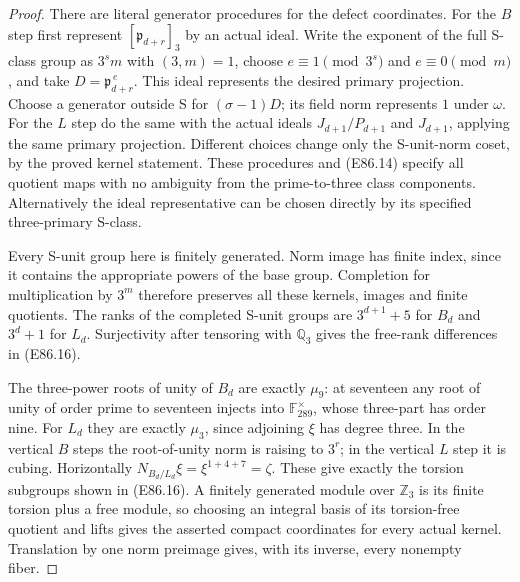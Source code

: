 \begin{proof}
There are literal generator procedures
for the defect coordinates. For the
$B$ step first represent
$[\mathfrak p_{d+r}]_3$ by an actual ideal.
Write the exponent of the full
S-class group as $3^s m$ with $(3,m)=1$,
choose $e\equiv1\pmod{3^s}$ and
$e\equiv0\pmod m$, and take
$D=\mathfrak p_{d+r}^{\,e}$.
This ideal represents the desired primary
projection. Choose a generator outside S
for $(\sigma-1)D$;
its field norm represents $1$ under
$\omega$. For the $L$ step do the same
with the actual ideals $J_{d+1}/P_{d+1}$
and $J_{d+1}$, applying the same primary
projection. Different choices change
only the S-unit-norm coset, by the
proved kernel statement. These procedures
and (E86.14) specify all quotient maps
with no ambiguity from the prime-to-three
class components. Alternatively the ideal
representative can be chosen directly by
its specified three-primary S-class.

Every S-unit group here is finitely
generated. Norm image has finite index,
since it contains the appropriate powers
of the base group. Completion for
multiplication by $3^m$ therefore preserves
all these kernels, images and finite
quotients. The ranks of the completed
S-unit groups are
$3^{d+1}+5$ for $B_d$ and $3^d+1$
for $L_d$. Surjectivity after tensoring
with $\mathbb Q_3$ gives the free-rank
differences in (E86.16).

The three-power roots of unity of $B_d$
are exactly $\mu_9$: at seventeen any
root of unity of order prime to seventeen
injects into $\mathbb F_{289}^\times$,
whose three-part has order nine.
For $L_d$ they are exactly $\mu_3$,
since adjoining $\xi$ has degree three.
In the vertical $B$ steps the root-of-unity
norm is raising to $3^r$; in the vertical
$L$ step it is cubing. Horizontally
$N_{B_d/L_d}\xi=\xi^{1+4+7}=\zeta$.
These give exactly the torsion subgroups
shown in (E86.16). A finitely generated
module over $\mathbb Z_3$ is its finite
torsion plus a free module, so choosing
an integral basis of its torsion-free
quotient and lifts gives the asserted
compact coordinates for every actual
kernel. Translation by one norm preimage
gives, with its inverse, every nonempty
fiber.
\end{proof}
